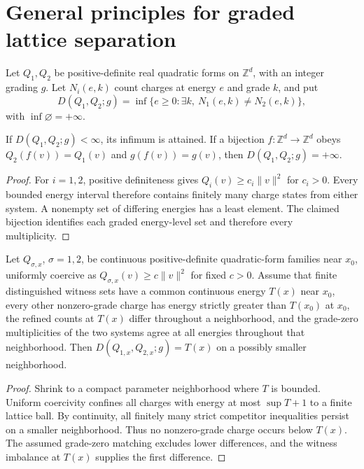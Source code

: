 \section{General principles for graded lattice separation}
Let $Q_1,Q_2$ be positive-definite real quadratic forms on $\mathbb Z^d$, with an integer grading $g$. Let $N_i(e,k)$ count charges at energy $e$ and grade $k$, and put
\[
D(Q_1,Q_2;g)=\inf\{e\ge0:\exists k,\ N_1(e,k)\ne N_2(e,k)\},
\]
with $\inf\varnothing=+\infty$.

\begin{proposition}
If $D(Q_1,Q_2;g)<\infty$, its infimum is attained. If a bijection $f:\mathbb Z^d\to\mathbb Z^d$ obeys $Q_2(f(v))=Q_1(v)$ and $g(f(v))=g(v)$, then $D(Q_1,Q_2;g)=+\infty$.
\end{proposition}
\begin{proof}
For $i=1,2$, positive definiteness gives $Q_i(v)\ge c_i\|v\|^2$ for $c_i>0$. Every bounded energy interval therefore contains finitely many charge states from either system. A nonempty set of differing energies has a least element. The claimed bijection identifies each graded energy-level set and therefore every multiplicity.
\end{proof}

\begin{proposition}
Let $Q_{\sigma,x}$, $\sigma=1,2$, be continuous positive-definite quadratic-form families near $x_0$, uniformly coercive as $Q_{\sigma,x}(v)\ge c\|v\|^2$ for fixed $c>0$. Assume that finite distinguished witness sets have a common continuous energy $T(x)$ near $x_0$, every other nonzero-grade charge has energy strictly greater than $T(x_0)$ at $x_0$, the refined counts at $T(x)$ differ throughout a neighborhood, and the grade-zero multiplicities of the two systems agree at all energies throughout that neighborhood. Then $D(Q_{1,x},Q_{2,x};g)=T(x)$ on a possibly smaller neighborhood.
\end{proposition}
\begin{proof}
Shrink to a compact parameter neighborhood where $T$ is bounded. Uniform coercivity confines all charges with energy at most $\sup T+1$ to a finite lattice ball. By continuity, all finitely many strict competitor inequalities persist on a smaller neighborhood. Thus no nonzero-grade charge occurs below $T(x)$. The assumed grade-zero matching excludes lower differences, and the witness imbalance at $T(x)$ supplies the first difference.
\end{proof}
